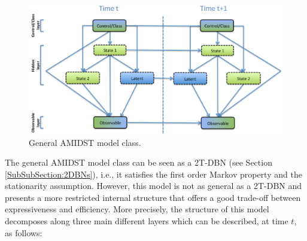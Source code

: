\begin{figure}[ht!]
\begin{center}
\includegraphics[scale=0.465]{./figures/AMIDSTModelClass}
\caption{\label{Figure:AMIDSTModelClass} General AMIDST model class.}
\end{center}
\end{figure}

The general AMIDST model class can be seen as a 2T-DBN (see Section \ref{SubSubSection:2DBNs}), i.e., it satisfies the first order Markov property and the stationarity assumption. However, this model is not as general as a 2T-DBN and presents a more restricted internal structure that offers a good trade-off between expressiveness and efficiency. More precisely, the structure of this model decomposes along three main different layers which can be described, at time $t$, as follows:


